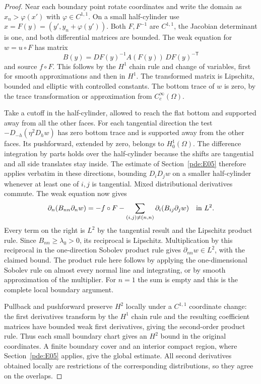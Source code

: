 \documentclass[11pt,oneside,openany]{book}
\theoremstyle{plain}
\theoremstyle{definition}
\theoremstyle{remark}
\begin{document}
\begin{proof}
Near each boundary point rotate coordinates and write the domain as
\(x_n>\varphi(x')\) with \(\varphi\in C^{1,1}\).
On a small half-cylinder use \(x=F(y)=(y',y_n+\varphi(y'))\).
Both \(F,F^{-1}\) are \(C^{1,1}\), the Jacobian determinant is
one, and both differential matrices are bounded. The weak
equation for \(w=u\circ F\) has matrix
\[
 B(y)=DF(y)^{-1}A(F(y))\,DF(y)^{-\mathsf T}
\]
and source \(f\circ F\). This follows by the \(H^1\) chain rule
and change of variables, first for smooth approximations and then
in \(H^1\). The transformed matrix is Lipschitz, bounded and
elliptic with controlled constants. The bottom trace of \(w\)
is zero, by the trace transformation or approximation from
\(C_c^\infty(\Omega)\).

Take a cutoff in the half-cylinder, allowed to reach the flat
bottom and supported away from all the other faces.
For each tangential direction the test
\(-D_{-h}(\eta^2 D_hw)\) has zero bottom trace and is supported
away from the other faces. Its pushforward, extended by zero,
belongs to \(H_0^1(\Omega)\). The difference integration by parts
holds over the half-cylinder because the shifts are tangential
and all side translates stay inside. The estimate of
Section~\ref{pde:E05} therefore applies verbatim in these directions,
bounding \(D_iD_jw\) on a smaller half-cylinder whenever at least
one of \(i,j\) is tangential. Mixed distributional derivatives
commute. The weak equation now gives
\[
 \partial_n(B_{nn}\partial_n w)
   =-f\circ F-\sum_{(i,j)\ne(n,n)}\partial_i(B_{ij}\partial_jw)
       \quad\hbox{in }L^2 .
\]
Every term on the right is \(L^2\) by the tangential result and the
Lipschitz product rule. Since \(B_{nn}\geq\lambda_0>0\), its
reciprocal is Lipschitz. Multiplication by this reciprocal in the
one-direction Sobolev product rule gives \(\partial_{nn}w\in L^2\),
with the claimed bound. The product rule here follows by applying
the one-dimensional Sobolev rule on almost every normal line
and integrating, or by smooth approximation of the multiplier.
For \(n=1\) the sum is empty and this is the complete local
boundary argument.

Pullback and pushforward preserve \(H^2\) locally under a
\(C^{1,1}\) coordinate change: the first derivatives transform
by the \(H^1\) chain rule and the resulting coefficient matrices
have bounded weak first derivatives, giving the second-order
product rule. Thus each small boundary chart gives an \(H^2\)
bound in the original coordinates. A finite boundary cover and
an interior compact region, where Section~\ref{pde:E05} applies,
give the global estimate. All second derivatives obtained locally
are restrictions of the corresponding distributions, so they
agree on the overlaps.
\end{proof}
\end{document}
